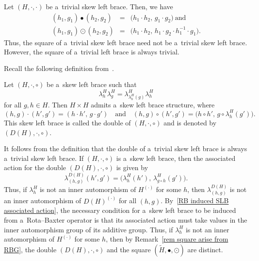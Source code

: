 \documentclass{jonasart}
\theoremstyle{plain}
\begin{document}
	\begin{example}
		Let $(H,\cdot,\cdot)$ be a~trivial skew left brace. Then, we have
		\begin{eqnarray*}
			(h_1, g_1 )\bullet (h_2, g_2 ) &=& \big(h_1\cdot h_2, \,g_1\cdot g_2 \big)~\textrm{and}\\
			(h_1, g_1 )\odot (h_2, g_2 ) &=& \big(h_1\cdot h_2, \, h_1\cdot g_2\cdot h_1^{-1} \cdot g_1 \big)\nonumber.
		\end{eqnarray*}
		Thus, the square of a~trivial skew left brace need not be a~trivial skew left brace. However, the square of a~trivial left brace is always trivial.
	\end{example}
	
	Recall the following definition from~\cite[Corollary 3.38]{MR3763907}.
	
	\begin{definition}
		Let $(H,\cdot,\circ)$ be a~skew left brace such that
		\begin{equation*}
			\lambda^H_h\lambda^H_g =\lambda^H_{\lambda^H_h (g)}\lambda^H_h
		\end{equation*}
		for all $g, h \in H$. Then $H\times H $ admits a~skew left brace structure, where
		\[
		(h,g) \cdot (h',g') = (h \cdot h', \, g \cdot g') \quad \text{and} \quad
		(h,g)\circ(h',g') = \big(h\circ h', \, g\circ\lambda^H_h (g') \big).
		\]
		This skew left brace is called the double of $(H,\cdot,\circ)$ and is denoted by $(D(H), \cdot,\circ)$.
	\end{definition}
	
	\begin{remark}
		It follows from the definition that the double of a~trivial skew left brace is always a~trivial skew left brace. If $(H,\cdot,\circ)$ is a~skew left brace, then the associated action for the double $(D(H), \cdot,\circ)$ is given by
		\begin{equation*}
			\lambda^{D(H)}_{(h,g)}(h',g')=\big(\lambda^H_h (h'), \, \lambda^H_{g\circ h}(g')\big).
		\end{equation*}
		Thus, if $\lambda^H_h$ is not an inner automorphism of $H^{(\cdot)}$ for some $h$, then $\lambda^{D(H)}_{(h,g)}$ is not an inner automorphism of $D(H)^{(\cdot)}$ for all $(h,g)$. By~\eqref{RB induced SLB associated action}, the necessary condition for a~skew left brace to be induced from a~Rota--Baxter operator is that its associated action must take values in the inner automorphism group of its additive group. Thus, if $\lambda^H_h$ is not an inner automorphism of $H^{(\cdot)}$ for some $h$, then by Remark~\ref{rem square arise from RBG}, the double $(D(H), \cdot, \circ)$ and the square $(\widetilde{H}, \bullet, \odot)$ are distinct.
	\end{remark}
	
\end{document}
